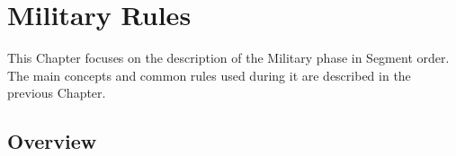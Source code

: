 
\chapter{Military Rules}\label{chapter:MilitaryNew}

\begin{designnote}
  This Chapter focuses on the description of the Military phase in
  Segment order. The main concepts and common rules used during it are
  described in the previous Chapter.
\end{designnote}

\section{Overview}
\aparag[Sequence]
\MilitaryDetailsNew

